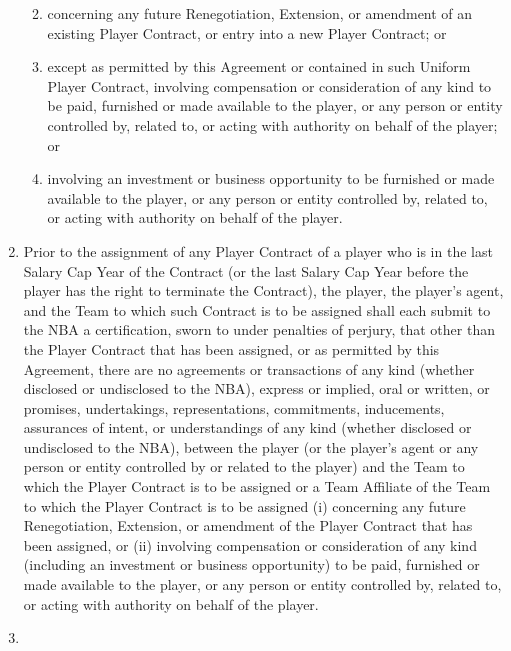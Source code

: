 \documentclass[
]{book}
\providecommand{\tightlist}{%
  \setlength{\itemsep}{0pt}\setlength{\parskip}{0pt}}
\begin{document}
\begin{enumerate}
  \begin{enumerate}
  \def\labelenumii{(\roman{enumii})}
  \tightlist
  \item
    concerning any future Renegotiation, Extension, or amendment of an existing Player Contract, or entry into a new Player Contract; or
  \item
    except as permitted by this Agreement or contained in such Uniform Player Contract, involving compensation or consideration of any kind to be paid, furnished or made available to the player, or any person or entity controlled by, related to, or acting with authority on behalf of the player; or
  \item
    involving an investment or business opportunity to be furnished or made available to the player, or any person or entity controlled by, related to, or acting with authority on behalf of the player.
  \end{enumerate}
\item
  Prior to the assignment of any Player Contract of a player who is in the last Salary Cap Year of the Contract (or the last Salary Cap Year before the player has the right to terminate the Contract), the player, the player's agent, and the Team to which such Contract is to be assigned shall each submit to the NBA a certification, sworn to under penalties of perjury, that other than the Player Contract that has been assigned, or as permitted by this Agreement, there are no agreements or transactions of any kind (whether disclosed or undisclosed to the NBA), express or implied, oral or written, or promises, undertakings, representations, commitments, inducements, assurances of intent, or understandings of any kind (whether disclosed or undisclosed to the NBA), between the player (or the player's agent or any person or entity controlled by or related to the player) and the Team to which the Player Contract is to be assigned or a Team Affiliate of the Team to which the Player Contract is to be assigned (i) concerning any future Renegotiation, Extension, or amendment of the Player Contract that has been assigned, or (ii) involving compensation or consideration of any kind (including an investment or business opportunity) to be paid, furnished or made available to the player, or any person or entity controlled by, related to, or acting with authority on behalf of the player.
\item

\end{enumerate}
\end{document}
